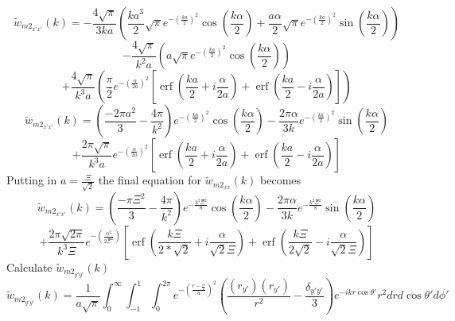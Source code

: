 \documentclass[12pt]{article}
\begin{document}
\[{}\]
\begin{displaymath}{\widetilde{w}_{{m2}_{x'x'}}(k)=-\frac{4\sqrt{\pi}}{3ka}\left(\frac{ka^3}{2}\sqrt{\pi}e^{-\left(\frac{ka}{2}\right)^2}\cos(\frac{k\alpha}{2})+\frac{a\alpha}{2}\sqrt{\pi}e^{-\left(\frac{ka}{2}\right)^2}\sin(\frac{k\alpha}{2})\right)}\end{displaymath} 
\begin{displaymath}{-\frac{4\sqrt{\pi}}{k^2a}\left(a\sqrt{\pi}e^{-\left(\frac{ka}{2}\right)^2}\cos(\frac{k\alpha}{2})\right)}\end{displaymath} 
\begin{equation}{+\frac{4\sqrt{\pi}}{k^3a}\left(\frac{\pi}{2}e^{-\left(\frac{\alpha}{2a}\right)^2}\left[\operatorname{erf}\left(\frac{ka}{2}+i\frac{\alpha}{2a}\right)+\operatorname{erf}\left(\frac{ka}{2}-i\frac{\alpha}{2a}\right)\right]\right)}\end{equation} 
\[{}\]
\begin{displaymath}{\widetilde{w}_{{m2}_{x'x'}}(k)=\left(\frac{-2\pi{a}^2}{3}-\frac{4\pi}{k^2}\right)e^{-\left(\frac{ka}{2}\right)^2}\cos(\frac{k\alpha}{2})-\frac{2\pi\alpha}{3k}e^{-\left(\frac{ka}{2}\right)^2}\sin(\frac{k\alpha}{2})}\end{displaymath} 
\begin{equation}{+\frac{2\pi\sqrt{\pi}}{k^3a}e^{-\left(\frac{\alpha}{2a}\right)^2}\left[\operatorname{erf}\left(\frac{ka}{2}+i\frac{\alpha}{2a}\right)+\operatorname{erf}\left(\frac{ka}{2}-i\frac{\alpha}{2a}\right)\right]}\end{equation} 
Putting in $a=\frac{\Xi}{\sqrt{2}}$ the final equation for $\widetilde{w}_{{m2}_{xx}}(k)$ becomes
\[{}\] \color{green}
\begin{displaymath}{\widetilde{w}_{{m2}_{x'x'}}(k)=\left(\frac{-\pi{\Xi}^2}{3}-\frac{4\pi}{k^2}\right)e^{-\frac{k^2\Xi^2}{8}}\cos(\frac{k\alpha}{2})-\frac{2\pi\alpha}{3k}e^{-\frac{k^2\Xi^2}{8}}\sin(\frac{k\alpha}{2})}\end{displaymath} 
\begin{equation}{+\frac{2\pi\sqrt{2\pi}}{k^3\Xi}e^{-\left(\frac{\alpha^2}{2\Xi^2}\right)}\left[\operatorname{erf}\left(\frac{k\Xi}{2*\sqrt{2}}+i\frac{\alpha}{\sqrt{2}\Xi}\right)+\operatorname{erf}\left(\frac{k\Xi}{2\sqrt{2}}-i\frac{\alpha}{\sqrt{2}\Xi}\right)\right]}\end{equation} 
\color{black}
\[{}\]
Calculate $\widetilde{w}_{{m2}_{y'y'}}(k)$ 
\begin{equation}{\widetilde{w}_{{m2}_{y'y'}}(k)=\frac{1}{a\sqrt{\pi}}\int_{0}^{\infty}\int_{-1}^{1}\int_{0}^{2\pi}e^{-\left(\frac{r-\frac{\alpha}{2}}{a}\right)^2}\left(\frac{(r_{y'})(r_{y'})}{r^2}-\frac{\delta_{y'y'}}{3}\right)e^{-ikr\cos\theta'}r^2d{r}d{\cos\theta'}d{\phi'}}\end{equation}
\end{document}
